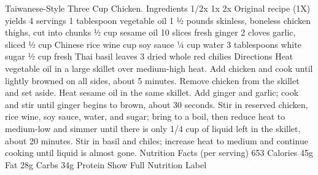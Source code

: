 Taiwanese-Style Three Cup Chicken. Ingredients 1/2x 1x 2x Original recipe (1X) yields 4 servings 1 tablespoon vegetable oil 1 ½ pounds skinless, boneless chicken thighs, cut into chunks ½ cup sesame oil 10 slices fresh ginger 2 cloves garlic, sliced ½ cup Chinese rice wine  cup soy sauce ¼ cup water 3 tablespoons white sugar ½ cup fresh Thai basil leaves 3 dried whole red chilies Directions Heat vegetable oil in a large skillet over medium-high heat. Add chicken and cook until lightly browned on all sides, about 5 minutes. Remove chicken from the skillet and set aside. Heat sesame oil in the same skillet. Add ginger and garlic; cook and stir until ginger begins to brown, about 30 seconds. Stir in reserved chicken, rice wine, soy sauce, water, and sugar; bring to a boil, then reduce heat to medium-low and simmer until there is only 1/4 cup of liquid left in the skillet, about 20 minutes. Stir in basil and chiles; increase heat to medium and continue cooking until liquid is almost gone. Nutrition Facts (per serving) 653 Calories 45g Fat 28g Carbs 34g Protein Show Full Nutrition Label
\par

